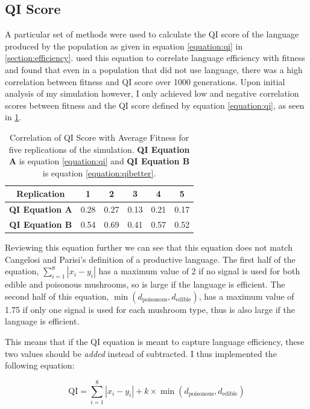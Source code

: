 \documentclass[12pt,a4paper]{report}
\begin{document}
\subsection{QI Score}

A particular set of methods were used to calculate the QI score of the language produced by the population as given in equation \ref{equation:qi} in \cref{section:efficiency}. \citet{Cangelosi1998} used this equation to correlate language efficiency with fitness and found that even in a population that did not use language, there was a high correlation between fitness and QI score over 1000 generations. Upon initial analysis of my simulation however, I only achieved low and negative correlation scores between fitness and the QI score defined by equation \ref{equation:qi}, as seen in \cref{table:qi-correlation}.

\begin{table}[t]
\centering
 \begin{tabular}{ c || c | c | c | c | c}
 \bf{Replication} & \bf{1} & \bf{2} & \bf{3} & \bf{4} & \bf{5}\\
 \hline
  \hline
\bf {QI Equation A} & 0.28 & 0.27 & 0.13 & 0.21 & 0.17 \\
 \hline
\bf {QI Equation B} & 0.54 & 0.69 & 0.41 & 0.57 & 0.52 \\
\end{tabular}
\caption{Correlation of QI Score with Average Fitness for five replications of the simulation. {\bf QI Equation A} is equation \ref{equation:qi} and {\bf QI Equation B} is equation \ref{equation:qibetter}.}
\label{table:qi-correlation}
\end{table}

Reviewing this equation further we can see that this equation does not match Cangelosi and Parisi's  definition of a productive language. The first half of the equation, $\sum^{8}_{i = 1} |x_i - y_i|$ has a maximum value of 2 if no signal is used for both edible and poisonous mushrooms, so is large if the language is efficient. The second half of this equation, $\min (d_{\mathrm{poisonous}}, d_{\mathrm{edible}})$, has a maximum value of 1.75 if only one signal is used for each mushroom type, thus is also large if the language is efficient. 

This means that if the QI equation is meant to capture language efficiency, these two values should be \emph{added} instead of subtracted. I thus implemented the following equation:

\begin{equation}
\label{equation:qibetter}
\mathrm{QI} = \sum^{8}_{i = 1} |x_i - y_i| + k \times \min (d_{\mathrm{poisonous}}, d_{\mathrm{edible}})
\end{equation}
\end{document}
